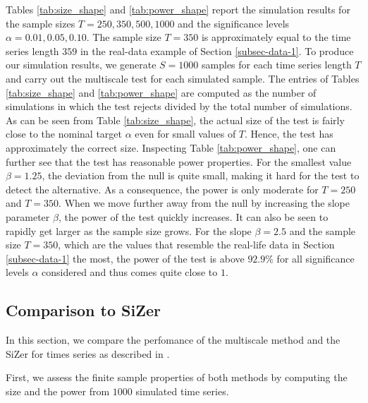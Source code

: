\documentclass[a4paper,12pt]{article}
\begin{document}
Tables \ref{tab:size_shape} and \ref{tab:power_shape} report the simulation results for the sample sizes $T=250,350,500, 1000$ and the significance levels $\alpha = 0.01, 0.05, 0.10$. The sample size $T = 350$ is approximately equal to the time series length $359$ in the real-data example of Section \ref{subsec-data-1}. To produce our simulation results, we generate $S=1000$ samples for each time series length $T$ and carry out the multiscale test for each simulated sample. The entries of Tables \ref{tab:size_shape} and \ref{tab:power_shape} are computed as the number of simulations in which the test rejects divided by the total number of simulations. As can be seen from Table \ref{tab:size_shape}, the actual size of the test is fairly close to the nominal target $\alpha$ even for small values of $T$. Hence, the test has approximately the correct size. Inspecting Table \ref{tab:power_shape}, one can further see that the test has reasonable power properties. For the smallest value $\beta = 1.25$, the deviation from the null is quite small, making it hard for the test to detect the alternative. As a consequence, the power is only moderate for $T=250$ and $T=350$. When we move further away from the null by increasing the slope parameter $\beta$, the power of the test quickly increases. It can also be seen to rapidly get larger as the sample size grows. For the slope $\beta =2.5$ and the sample size $T=350$, which are the values that resemble the real-life data in Section \ref{subsec-data-1} the most, the power of the test is above $92.9\%$ for all significance levels $\alpha$ considered and thus comes quite close to $1$. 

\subsection{Comparison to SiZer}\label{subsec-sim-2}

In this section, we compare the perfomance of the multiscale method and the SiZer for times series as described in \cite{Rondonotti2007}. 

First, we assess the finite sample properties of both methods by computing the size and the power from $1000$ simulated time series.
\end{document}
